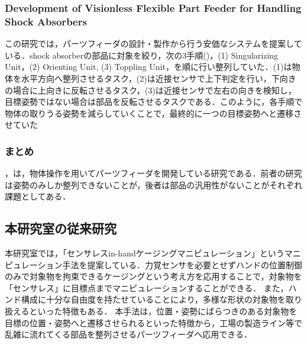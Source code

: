 \documentclass[a4paper,twoside,12pt,papersize, dvipdfmx]{iirthesis}
\begin{document}
\subsubsection{Development of Visionless Flexible Part Feeder for Handling Shock Absorbers \cite{udhayakumar2021}}
この研究では，パーツフィーダの設計・製作から行う安価なシステムを提案している．shock absorberの部品に対象を絞り，次の3手順()，(1) Singularizing Unit，(2) Orienting Unit, (3) Toppling Unit，を順に行い整列していた．(1)は物体を水平方向へ整列させるタスク，(2)は近接センサで上下判定を行い，下向きの場合に上向きに反転させるタスク，(3)は近接センサで左右の向きを検知し，目標姿勢ではない場合は部品を反転させるタスクである．このように，各手順で物体の取りうる姿勢を減らしていくことで，最終的に一つの目標姿勢へと遷移させていた


\subsubsection{まとめ}
\cite{akella2000}，\cite{udhayakumar2021}は，物体操作を用いてパーツフィーダを開発している研究である．前者の研究は姿勢のみしか整列できないことが，後者は部品の汎用性がないことがそれぞれ課題としてある．

\subsection{本研究室の従来研究}
本研究室では，「センサレスin-handケージングマニピュレーション」というマニピュレーション手法を提案している．力覚センサを必要とせずハンドの位置制御のみで対象物を拘束できるケージングという考え方を応用することで，対象物を「センサレス」に目標点までマニピュレーションすることができる．
また，ハンド構成に十分な自由度を持たせていることにより，多様な形状の対象物を取り扱えるといった特徴もある．
本手法は，位置・姿勢にばらつきのある対象物を目標の位置・姿勢へと遷移させられるといった特徴から，工場の製造ライン等で乱雑に流れてくる部品を整列させるパーツフィーダへ応用できる．
\end{document}
